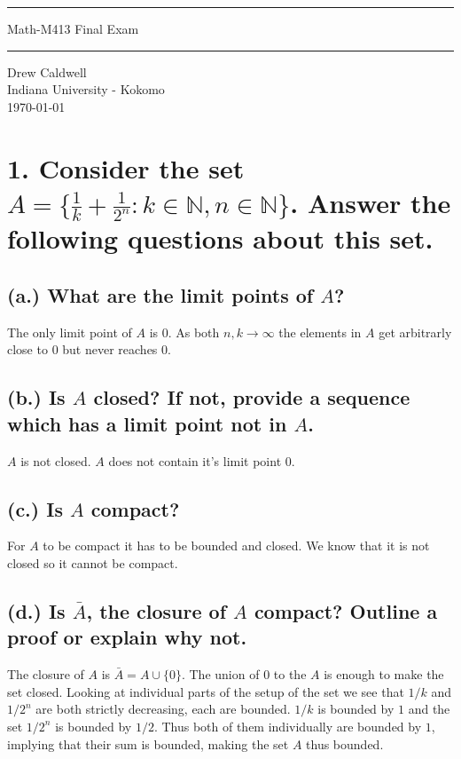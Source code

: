 \documentclass{article}
\begin{document}
\begin{titlepage}
\scshape
\centering
\raisebox{-\baselineskip}{\rule{\textwidth}{1px}}
\vspace{.3cm}
\rule{\textwidth}{.5px}
\vspace{.3cm}
{\huge{{Math-M413 Final Exam}}}\par \vspace{0.3cm}
\rule{\textwidth}{2px}

\large{Drew Caldwell}\\
\large{Indiana University - Kokomo}\\
\vspace{1.3cm}
\vfill
\today
\end{titlepage}

\section*{1. Consider the set $A = \{\frac{1}{k} + \frac{1}{2^n} : k \in \mathbb{N}, n \in \mathbb{N}\}$. Answer the following questions about this set.}
\subsection*{(a.) What are the limit points of $A$?}

The only limit point of $A$ is $0$. As both $n,k \to \infty$ the elements in $A$ get arbitrarly close to $0$ but never reaches $0$.

\subsection*{(b.) Is $A$ closed? If not, provide a sequence which has a limit point not in $A$.}

$A$ is not closed. $A$ does not contain it's limit point $0$.

\subsection*{(c.) Is $A$ compact?}

For $A$ to be compact it has to be bounded and closed. We know that it is not closed so it cannot be compact.

\subsection*{(d.) Is $\bar{A}$, the closure of $A$ compact? Outline a proof or explain why not.}

The closure of $A$ is $\bar{A} = A \cup \{0\}$. The union of $0$ to the $A$ is enough to make the set closed. Looking at 
individual parts of the setup of the set we see that $1/k$ and $1/2^n$ are both strictly decreasing, each are bounded. $1/k$ is bounded 
by $1$ and the set $1/2^n$ is bounded by $1/2$. Thus both of them individually are bounded by $1$, implying that their sum is bounded, 
making the set $A$ thus bounded.
\end{document}

